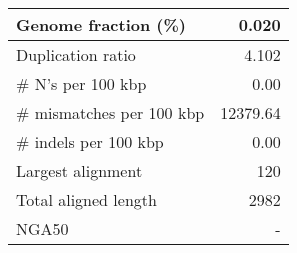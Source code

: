 \documentclass[12pt,a4paper]{article}
\begin{document}
\begin{table}[ht]
\begin{center}
\begin{tabular}{|l*{1}{|r}|}
Genome fraction (\%) & 0.020 \\ \hline
Duplication ratio & 4.102 \\ \hline
\# N's per 100 kbp & 0.00 \\ \hline
\# mismatches per 100 kbp & 12379.64 \\ \hline
\# indels per 100 kbp & 0.00 \\ \hline
Largest alignment & 120 \\ \hline
Total aligned length & 2982 \\ \hline
NGA50 & - \\ \hline
\end{tabular}
\end{center}
\end{table}
\end{document}
